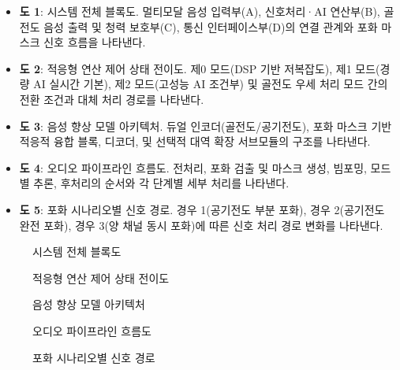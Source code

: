 \documentclass{article}
\DeclareRobustCommand{\codexedit}[1]{\textcolor{customorange}{#1}}
\begin{document}
\begin{itemize}
    \item \textbf{도 1}: 시스템 전체 블록도. 멀티모달 음성 입력부(A), 신호처리·AI 연산부(B), 골전도 음성 출력 및 청력 보호부(C), 통신 인터페이스부(D)의 연결 관계와 포화 마스크 신호 흐름을 나타낸다.
    \item \codexedit{\textbf{도 2}: 적응형 연산 제어 상태 전이도. 제0 모드(DSP 기반 저복잡도), 제1 모드(경량 AI 실시간 기본), 제2 모드(고성능 AI 조건부) 및 골전도 우세 처리 모드 간의 전환 조건과 대체 처리 경로를 나타낸다.}
    \item \textbf{도 3}: 음성 향상 모델 아키텍처. 듀얼 인코더(골전도/공기전도), 포화 마스크 기반 적응적 융합 블록, 디코더, 및 선택적 대역 확장 서브모듈의 구조를 나타낸다.
    \item \textbf{도 4}: 오디오 파이프라인 흐름도. 전처리, 포화 검출 및 마스크 생성, 빔포밍, 모드별 추론, 후처리의 순서와 각 단계별 세부 처리를 나타낸다.
    \item \textbf{도 5}: 포화 시나리오별 신호 경로. 경우 1(공기전도 부분 포화), 경우 2(공기전도 완전 포화), 경우 3(양 채널 동시 포화)에 따른 신호 처리 경로 변화를 나타낸다.
\end{itemize}

\begin{figure}[H]
    \centering
    \resizebox{\textwidth}{!}{%
    }
    \caption{시스템 전체 블록도}
    \label{fig:system-block}
\end{figure}

\begin{figure}[H]
    \centering
    \resizebox{0.97\textwidth}{!}{%
    }
    \caption{적응형 연산 제어 상태 전이도}
    \label{fig:state-transition}
\end{figure}

\begin{figure}[H]
    \centering
    \resizebox{0.97\textwidth}{!}{%
    }
    \caption{음성 향상 모델 아키텍처}
    \label{fig:model-architecture}
\end{figure}

\begin{figure}[H]
    \centering
    \resizebox{0.97\textwidth}{!}{%
    }
    \caption{오디오 파이프라인 흐름도}
    \label{fig:audio-pipeline}
\end{figure}

\begin{figure}[H]
    \centering
    \resizebox{0.97\textwidth}{!}{%
    }
    \caption{포화 시나리오별 신호 경로}
    \label{fig:saturation-scenarios}
\end{figure}
\end{document}
